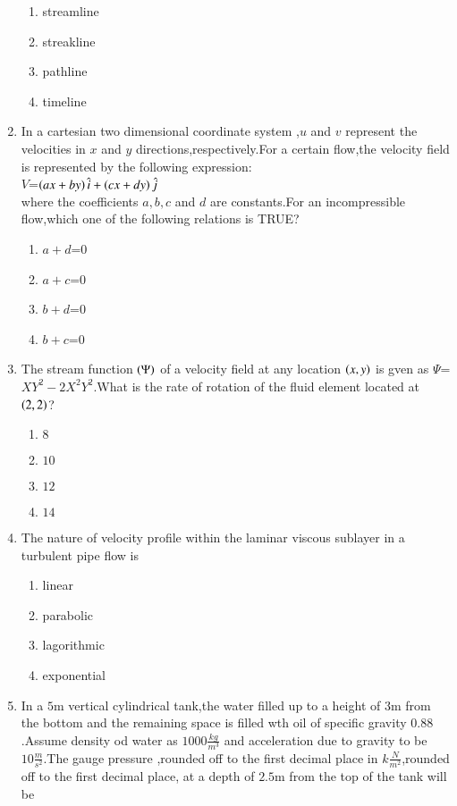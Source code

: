 \documentclass[journal]{IEEEtran}
\begin{document}
\begin{enumerate}[start=14]
\begin{tikzpicture}
\end{tikzpicture}
    \begin{enumerate}
        \item streamline
        \item streakline
        \item pathline
        \item timeline
    \end{enumerate}
    \item In a cartesian two dimensional coordinate system ,$u$ and $v$ represent the velocities in $x$ and $y$ directions,respectively.For a certain flow,the velocity field is represented by the following expression:\\
    $V$=$\brak{ax+by}\hat{i}+\brak{cx+dy}\hat{j}$\\
    where the coefficients $a,b,c$ and $d$ are constants.For an incompressible flow,which one of the following relations is TRUE?
    \begin{enumerate}
        \item $a+d$=$0$
        \item $a+c$=$0$
        \item $b+d$=$0$
        \item $b+c$=$0$
    \end{enumerate}
    \item The stream function $\brak{\Psi}$ of a velocity field at any location $\brak{x,y}$ is gven as $\Psi$=$XY^2-2X^2Y^2$.What is the rate of rotation of the fluid element located at $\brak{2,2}$?
    \begin{enumerate}
        \item $8$
        \item $10$
        \item $12$
        \item $14$
    \end{enumerate}
    \item The nature of velocity profile within the laminar viscous sublayer in a turbulent pipe flow is
    \begin{enumerate}
        \item linear
        \item parabolic
        \item lagorithmic
        \item exponential
    \end{enumerate}
    \item In a $5$m vertical cylindrical tank,the water filled up to a height of $3$m from the bottom and the remaining space is filled wth oil of specific gravity $0.88$.Assume density od water as $1000\frac{kg}{m^3}$ and acceleration due to gravity to be $10\frac{m}{s^2}$.The gauge pressure ,rounded off to the first decimal place in $k\frac{N}{m^2}$,rounded off to the first decimal place, at a depth of $2.5$m from the top of the tank will be

\end{enumerate}
\end{document}
